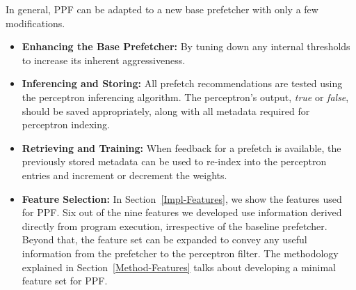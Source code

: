 In general, PPF can be adapted to a new base prefetcher with only a few modifications.
\begin{itemize}

\item \textbf{Enhancing the Base Prefetcher:} By tuning down any
  internal thresholds to increase its inherent aggressiveness.

\item \textbf{Inferencing and Storing:} All prefetch recommendations
  are tested using the perceptron inferencing algorithm. The
  perceptron's output, \textit{true} or \textit{false}, should be
  saved appropriately, along with all metadata required for perceptron
  indexing.

\item \textbf{Retrieving and Training:} When feedback for a prefetch
  is available, the previously stored metadata can be used to re-index
  into the perceptron entries and increment or decrement the weights.

\item \textbf{Feature Selection:} In Section~\ref{Impl-Features}, we
  show the features used for PPF. Six out of the nine features we
  developed use information derived directly from program execution,
  irrespective of the baseline prefetcher. Beyond that, the feature
  set can be expanded to convey any useful information from the
  prefetcher to the perceptron filter.  The methodology explained in
  Section~\ref{Method-Features} talks about developing a minimal
  feature set for PPF.

\end{itemize}
